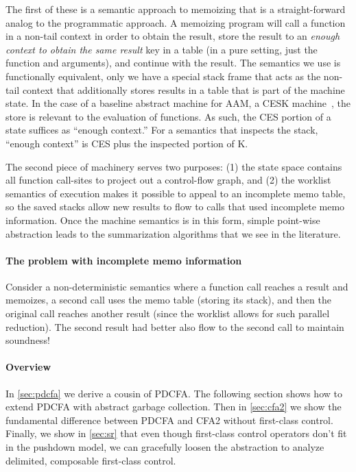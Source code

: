 The first of these is a semantic approach to memoizing that is a straight-forward analog to the programmatic approach.
%
A memoizing program will call a function in a non-tail context in order to obtain the result, store the result to an \emph{enough context to obtain the same result} key in a table (in a pure setting, just the function and arguments), and continue with the result.
%
The semantics we use is functionally equivalent, only we have a special stack frame that acts as the non-tail context that additionally stores results in a table that is part of the machine state.
%
In the case of a baseline abstract machine for AAM, a CESK machine~\citep{dvanhorn:Felleisen1987Calculus}, the store is relevant to the evaluation of functions.
%
As such, the CES portion of a state suffices as ``enough context.''
%
For a semantics that inspects the stack, ``enough context'' is CES plus the inspected portion of K.

The second piece of machinery serves two purposes:
%
(1) the state space contains all function call-sites to project out a control-flow graph, and %
(2) the worklist semantics of execution makes it possible to appeal to an incomplete memo table, so the saved stacks allow new results to flow to calls that used incomplete memo information.
%
Once the machine semantics is in this form, simple point-wise abstraction leads to the summarization algorithms that we see in the literature.

\paragraph{The problem with incomplete memo information}
Consider a non-deterministic semantics where a function call reaches a result and memoizes, a second call uses the memo table (storing its stack), and then the original call reaches another result (since the worklist allows for such parallel reduction).
%
The second result had better also flow to the second call to maintain soundness!

\paragraph{Overview}
In \autoref{sec:pdcfa} we derive a cousin of PDCFA.
%
The following section shows how to extend PDCFA with abstract garbage collection. %
%
Then in \autoref{sec:cfa2} we show the fundamental difference between PDCFA and CFA2 without first-class control. %
%
%
Finally, we show in \autoref{sec:sr} that even though first-class control operators don't fit in the pushdown model, we can gracefully loosen the abstraction to analyze delimited, composable first-class control.

